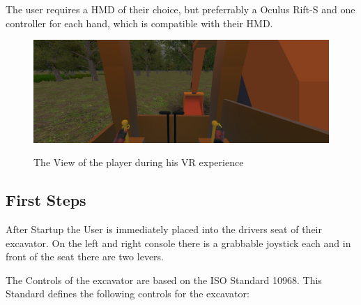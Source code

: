 \documentclass[journal]{vgtc}                     %
\begin{document}
The user requires a HMD of their choice, but preferrably a Oculus Rift-S and one controller for each hand, which is compatible with their HMD.

\begin{figure}[tb]%
  \centering %
  \includegraphics[width=\columnwidth, alt={The view from the cabin of a excavator. Each hand is on the joystick for controlling the vehicles arms and body}]{ExcavatorCabinView}
  \caption{%
  	The View of the player during his VR experience%
  }
  \label{fig:cabin_view}
\end{figure}

\subsection{First Steps}
After Startup the User is immediately placed into the drivers seat of their excavator. On the left and right console there is a grabbable joystick each and in front of the seat there are two levers. 

The Controls of the excavator are based on the ISO Standard 10968. This Standard defines the following controls for the excavator:
\end{document}
